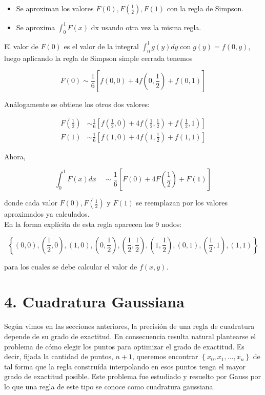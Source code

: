 \documentclass[10pt]{article}
\begin{document}
\begin{itemize}
  \item Se aproximan los valores $F(0), F\left(\frac{1}{2}\right), F(1)$ con la regla de Simpson.
  \item Se aproxima $\int_{0}^{1} F(x)$ dx usando otra vez la misma regla.
\end{itemize}

El valor de $F(0)$ es el valor de la integral $\int_{0}^{1} g(y) d y \operatorname{con} g(y)=f(0, y)$, luego aplicando la regla de Simpson simple cerrada tenemos

$$
F(0) \sim \frac{1}{6}\left[f(0,0)+4 f\left(0, \frac{1}{2}\right)+f(0,1)\right]
$$

Análogamente se obtiene los otros dos valores:

$$
\begin{aligned}
F\left(\frac{1}{2}\right) & \sim \frac{1}{6}\left[f\left(\frac{1}{2}, 0\right)+4 f\left(\frac{1}{2}, \frac{1}{2}\right)+f\left(\frac{1}{2}, 1\right)\right] \\
F(1) & \sim \frac{1}{6}\left[f(1,0)+4 f\left(1, \frac{1}{2}\right)+f(1,1)\right]
\end{aligned}
$$

Ahora,

$$
\int_{0}^{1} F(x) d x \quad \sim \frac{1}{6}\left[F(0)+4 F\left(\frac{1}{2}\right)+F(1)\right]
$$

donde cada valor $F(0), F\left(\frac{1}{2}\right)$ y $F(1)$ se reemplazan por los valores aproximados ya calculados.\\
En la forma explícita de esta regla aparecen los 9 nodos:

$$
\left\{(0,0),\left(\frac{1}{2}, 0\right),(1,0),\left(0, \frac{1}{2}\right),\left(\frac{1}{2}, \frac{1}{2}\right),\left(1, \frac{1}{2}\right),(0,1),\left(\frac{1}{2}, 1\right),(1,1)\right\}
$$

para los cuales se debe calcular el valor de $f(x, y)$.

\section*{4. Cuadratura Gaussiana}
Según vimos en las secciones anteriores, la precisión de una regla de cuadratura depende de su grado de exactitud. En consecuencia resulta natural plantearse el problema de cómo elegir los puntos para optimizar el grado de exactitud. Es decir, fijada la cantidad de puntos, $n+1$, queremos encontrar $\left\{x_{0}, x_{1}, \ldots, x_{n}\right\}$ de tal forma que la regla construída interpolando en esos puntos tenga el mayor grado de exactitud posible. Este problema fue estudiado y resuelto por Gauss por lo que una regla de este tipo se conoce como cuadratura gaussiana.
\end{document}
